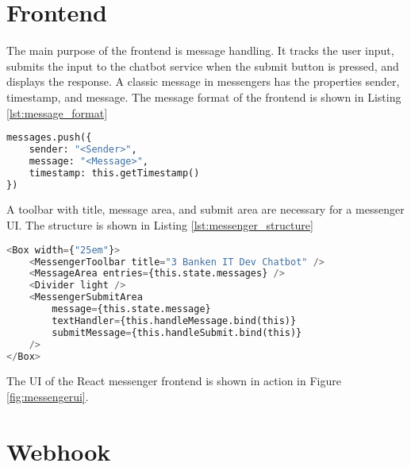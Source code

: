 



\section{Frontend}
The main purpose of the frontend is message handling.
It tracks the user input, submits the input to the chatbot service 
when the submit button is pressed, 
and displays the response.
A classic message in messengers has the properties sender, timestamp, and message.
The message format of the frontend is shown in Listing \ref{lst:message_format}
\begin{lstlisting}[caption={Message Format}, label={lst:message_format},captionpos=b,frame=single,language={Python},commentstyle=\color{mygreen},keywordstyle=\color{blue},
    morekeywords={}]                
messages.push({
    sender: "<Sender>",
    message: "<Message>",
    timestamp: this.getTimestamp()
})
\end{lstlisting}  
A toolbar with title, message area, and submit area are necessary for a messenger UI.
The structure is shown in Listing \ref{lst:messenger_structure}
\begin{lstlisting}[caption={Messenger Structure}, label={lst:messenger_structure},captionpos=b,frame=single,language={Python},commentstyle=\color{mygreen},keywordstyle=\color{blue},
    morekeywords={MessengerToolbar, MessageArea, Divider, MessengerSubmitArea, Box}]                
<Box width={"25em"}>
    <MessengerToolbar title="3 Banken IT Dev Chatbot" />
    <MessageArea entries={this.state.messages} />
    <Divider light />
    <MessengerSubmitArea 
        message={this.state.message} 
        textHandler={this.handleMessage.bind(this)} 
        submitMessage={this.handleSubmit.bind(this)} 
    />
</Box>
\end{lstlisting}  


The UI of the React messenger frontend is shown in action in Figure \ref{fig:messengerui}.
\section{Webhook}
